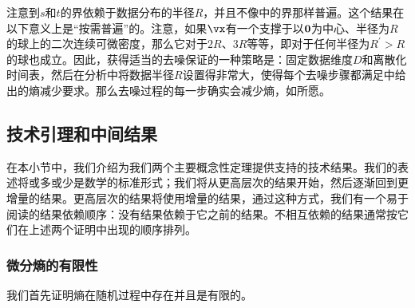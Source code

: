\documentclass[../../book-main_zh.tex]{subfiles}
\begin{document}
注意到\(s\)和\(t\)的界依赖于数据分布的半径\(R\)，并且不像中的界那样普遍。这个结果在以下意义上是“按需普遍”的。注意，如果\(\vx\)有一个支撑于以\(\bm{0}\)为中心、半径为\(R\)的球上的二次连续可微密度，那么它对于\(2R\)、\(3R\)等等，即对于任何半径为\(R^{\prime} > R\)的球也成立。因此，获得适当的去噪保证的一种策略是：固定数据维度\(D\)和离散化时间表，然后在分析中将数据半径\(R\)设置得非常大，使得每个去噪步骤都满足中给出的熵减少要求。那么去噪过程的每一步确实会减少熵，如所愿。

 
\subsection{技术引理和中间结果}\label{sub:app_diffusion_intermediate_results}

在本小节中，我们介绍为我们两个主要概念性定理提供支持的技术结果。我们的表述将或多或少是数学的标准形式；我们将从更高层次的结果开始，然后逐渐回到更增量的结果。更高层次的结果将使用增量的结果，通过这种方式，我们有一个易于阅读的结果依赖顺序：没有结果依赖于它之前的结果。不相互依赖的结果通常按它们在上述两个证明中出现的顺序排列。


\subsubsection{微分熵的有限性}

我们首先证明熵在随机过程中存在并且是有限的。
\end{document}
